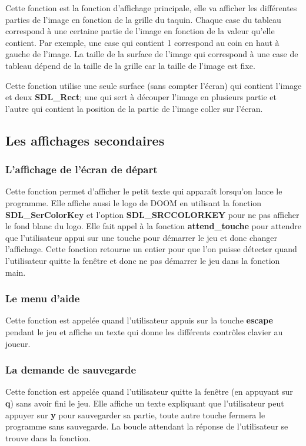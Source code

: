 \documentclass[a4paper]{article}
\begin{document}
Cette fonction est la fonction d'affichage principale, elle va afficher les
différentes parties de l'image en fonction de la grille du taquin. Chaque case du
tableau correspond à une certaine partie de l'image en fonction de la valeur
qu'elle contient. Par exemple, une case qui contient 1 correspond au coin en haut
à gauche de l'image. La taille de la surface de l'image qui correspond à une
case de tableau dépend de la taille de la grille car la taille de l'image est fixe.

Cette fonction utilise une seule surface (sans compter l'écran) qui contient
l'image et deux \textbf{SDL\_Rect}; une qui sert à découper l'image en plusieurs
partie et l'autre qui contient la position de la partie de l'image coller sur l'écran.

\subsection{Les affichages secondaires}
\subsubsection{L'affichage de l'écran de départ}

Cette fonction permet d'afficher le petit texte qui apparaît lorsqu'on lance le
programme. Elle affiche aussi le logo de DOOM en utilisant la fonction
\textbf{SDL\_SerColorKey} et l'option \textbf{SDL\_SRCCOLORKEY} pour ne pas
afficher le fond blanc du logo. Elle fait appel à la fonction \textbf{attend\_touche} pour
attendre que l'utilisateur appui sur une touche pour démarrer le jeu et donc
changer l'affichage. Cette fonction retourne un entier pour que l'on puisse
détecter quand l'utilisateur quitte la fenêtre et donc ne pas démarrer le jeu dans
la fonction main.

\subsubsection{Le menu d'aide}

Cette fonction est appelée quand l'utilisateur appuis sur la touche \textbf{escape}
pendant le jeu et affiche un texte qui donne les différents contrôles clavier au
joueur.

\subsubsection{La demande de sauvegarde}

Cette fonction est appelée quand l'utilisateur quitte la fenêtre (en appuyant
sur \textbf{q}) sans avoir fini le jeu. Elle affiche un texte expliquant que
l'utilisateur peut appuyer sur \textbf{y} pour sauvegarder sa partie, toute
autre touche fermera le programme sans sauvegarde. La boucle attendant la
réponse de l'utilisateur se trouve dans la fonction.
\end{document}
